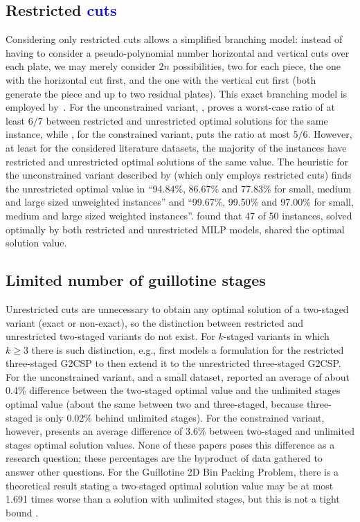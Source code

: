 \documentclass[ppgc,tese,english,formais,babel]{iiufrgs}
\newif\iffinalversion
\newcommand{\newtext}[1]{\iffinalversion%
#1%
\else%
\textcolor{blue}{#1}%
\fi%
}
\begin{document}
\subsection{Restricted \newtext{cuts}}

Considering only restricted cuts allows a simplified branching model: instead of having to consider a pseudo-polynomial number horizontal and vertical cuts over each plate, we may merely consider \(2n\) possibilities, two for each piece, the one with the horizontal cut first, and the one with the vertical cut first (both generate the piece and up to two residual plates).
This exact branching model is employed by~\citet{silva:2010}.
For the unconstrained variant, \citet{song:2010}, proves a worst-case ratio of at least \(6/7\) between restricted and unrestricted optimal solutions for the same instance, while \citet{furini:2016}, for the constrained variant, puts the ratio  at most \(5/6\).
However, at least for the considered literature datasets, the majority of the instances have restricted and unrestricted optimal solutions of the same value.
The heuristic for the unconstrained variant described by \citet{song:2010} (which only employs restricted cuts) finds the unrestricted optimal value in ``94.84\%, 86.67\% and 77.83\% for small, medium and large sized unweighted instances'' and ``99.67\%, 99.50\% and 97.00\% for small, medium and large sized weighted instances''.
\citet{furini:2016} found that 47 of 50 instances, solved optimally by both restricted and unrestricted MILP models, shared the optimal solution value.

\subsection{Limited number of guillotine stages}

Unrestricted cuts are unnecessary to obtain any optimal solution of a two-staged variant (exact or non-exact), so the distinction between restricted and unrestricted two-staged variants do not exist.
For \(k\)-staged variants in which~\(k \geq 3\) there is such distinction, e.g., \citet{puchinger:2007} first models a formulation for the restricted three-staged G2CSP to then extend it to the unrestricted three-staged G2CSP.
For the unconstrained variant, and a small dataset, \citet{beasley:1985:guillotine} reported an average of about 0.4\% difference between the two-staged optimal value and the unlimited stages optimal value (about the same between two and three-staged, because three-staged is only 0.02\% behind unlimited stages).
For the constrained variant, however, \citet{martin:2020:models} presents an average difference of 3.6\% between two-staged and unlimited stages optimal solution values.
None of these papers poses this difference as a research question; these percentages are the byproduct of data gathered to answer other questions.
For the Guillotine 2D Bin Packing Problem, there is a theoretical result stating a two-staged optimal solution value may be at most 1.691 times worse than a solution with unlimited stages, but this is not a tight bound \citep{bansal:2005}.
\end{document}
